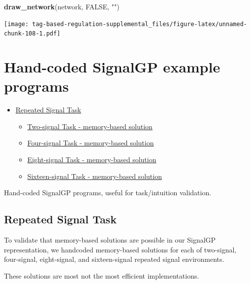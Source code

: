 \documentclass[
]{book}
\newenvironment{Shaded}{\begin{snugshade}}{\end{snugshade}}
\newcommand{\KeywordTok}[1]{\textcolor[rgb]{0.13,0.29,0.53}{\textbf{#1}}}
\newcommand{\NormalTok}[1]{#1}
\newcommand{\OtherTok}[1]{\textcolor[rgb]{0.56,0.35,0.01}{#1}}
\newcommand{\StringTok}[1]{\textcolor[rgb]{0.31,0.60,0.02}{#1}}
\providecommand{\tightlist}{%
  \setlength{\itemsep}{0pt}\setlength{\parskip}{0pt}}
\begin{document}
\begin{Shaded}
\begin{Highlighting}[]
\KeywordTok{draw\_network}\NormalTok{(network, }\OtherTok{FALSE}\NormalTok{, }\StringTok{""}\NormalTok{)}
\end{Highlighting}
\end{Shaded}

\texttt{[image: tag-based-regulation-supplemental\_files/figure-latex/unnamed-chunk-108-1.pdf]}

\hypertarget{hand-coded-signalgp-example-programs}{%
\chapter{Hand-coded SignalGP example programs}\label{hand-coded-signalgp-example-programs}}

\begin{itemize}
\tightlist
\item
  \protect\hyperlink{repeated-signal-task}{Repeated Signal Task}

  \begin{itemize}
  \tightlist
  \item
    \protect\hyperlink{two-signal-task---memory-based-solution}{Two-signal Task - memory-based solution}
  \item
    \protect\hyperlink{four-signal-task---memory-based-solution}{Four-signal Task - memory-based solution}
  \item
    \protect\hyperlink{eight-signal-task---memory-based-solution}{Eight-signal Task - memory-based solution}
  \item
    \protect\hyperlink{sixteen-signal-task---memory-based-solution}{Sixteen-signal Task - memory-based solution}
  \end{itemize}
\end{itemize}

Hand-coded SignalGP programs, useful for task/intuition validation.

\hypertarget{repeated-signal-task}{%
\section{Repeated Signal Task}\label{repeated-signal-task}}

To validate that memory-based solutions are possible in our SignalGP representation, we handcoded memory-based
solutions for each of two-signal, four-signal, eight-signal, and sixteen-signal repeated signal environments.

These solutions are most not the most efficient implementations.
\end{document}

